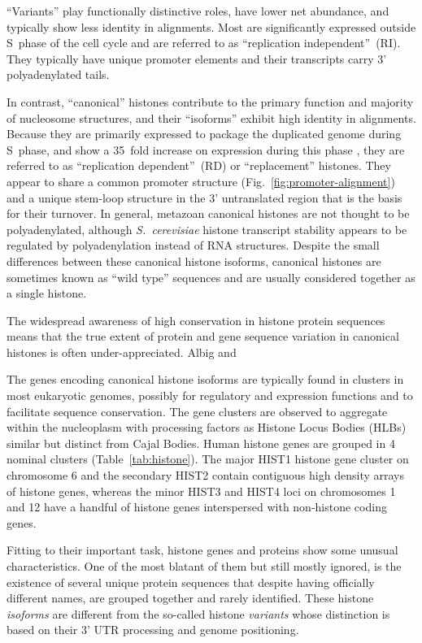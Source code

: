 \documentclass[10pt,a4paper,draft]{article}
\newcommand{\think}[2][]{\todo[caption={#2}, size=\small, #1]{\renewcommand{\baselinestretch}{0.5}\selectfont#2\par}}
\begin{document}
    ``Variants'' play functionally distinctive roles, have lower net abundance, and typically show less
    identity in alignments. Most are significantly expressed outside S~phase of the cell cycle and are
    referred to as ``replication independent''~(RI). They typically have unique promoter elements and their
    transcripts carry 3' polyadenylated tails.

    In contrast, ``canonical'' histones contribute to the primary function and majority of nucleosome
    structures, and their ``isoforms'' exhibit high identity in alignments. Because they are primarily
    expressed to package the duplicated genome during S~phase, and show a 35~fold increase on expression
    during this phase \cite{harris-1991}, they are referred to as ``replication dependent''~(RD) or ``replacement''
    histones. They appear to share a common promoter structure (Fig.~\ref{fig:promoter-alignment}) and
    a unique stem-loop structure in the 3' untranslated region that is the
    basis for their turnover. In general, metazoan canonical histones
    are not thought to be polyadenylated, although \textit{S.\ cerevisiae} histone transcript stability
    appears to be regulated by polyadenylation instead of RNA structures. Despite the small differences between these canonical histone isoforms,
    canonical histones are sometimes known as ``wild type'' sequences and are usually considered together
    as a single histone.

    The widespread awareness of high conservation in histone protein sequences means that the true extent
    of protein and gene sequence variation in canonical histones is often under-appreciated. Albig and 


    The genes encoding canonical histone isoforms are typically found in clusters in most eukaryotic genomes,
    possibly for regulatory and expression functions and to facilitate sequence conservation. The gene clusters
    are observed to aggregate within the nucleoplasm with processing factors as Histone Locus Bodies
    (HLBs) similar but distinct from Cajal Bodies. Human histone genes are grouped in 4 nominal clusters
    (Table~\ref{tab:histone}). The major HIST1 histone gene cluster on chromosome 6 and the secondary
    HIST2 contain contiguous high density arrays of histone genes, whereas the minor HIST3 and HIST4
    loci on chromosomes 1 and 12 have a handful of histone genes interspersed with non-histone coding genes.


    Fitting to their important task, histone genes and proteins show some unusual characteristics.
    One of the most blatant of them but still mostly ignored, is the existence of several unique protein
    sequences \think{should explain better that we're not talking about SNP?} that despite having
    officially different names, are grouped together and rarely identified. These histone
    \emph{isoforms} are different from the so-called histone \emph{variants} whose distinction
    is based on their 3' UTR processing and genome positioning.
\end{document}
